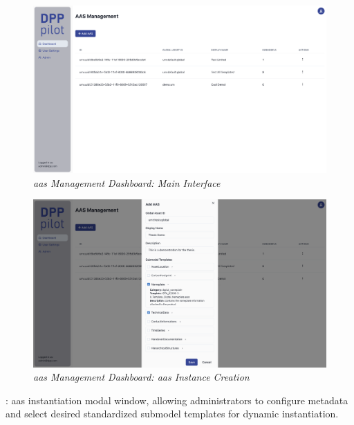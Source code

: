 \begin{figure}[H]
  \centering
  \includegraphics[width=\textwidth]{figures/pilot_interface_1.png}
  \caption{%
    \textit{\ac{aas} Management Dashboard: Main Interface} 
  }
  \label{fig:pilot_interface_1}
\end{figure}

\begin{figure}[H]
  \centering
  \includegraphics[width=\textwidth]{figures/pilot_interface_2.png}
  \caption{%
    \textit{\ac{aas} Management Dashboard: \ac{aas} Instance Creation} 
  }
  \label{fig:pilot_interface_2}
\end{figure}

: \ac{aas} instantiation modal window, allowing administrators to configure metadata and select desired standardized submodel templates for dynamic instantiation.

